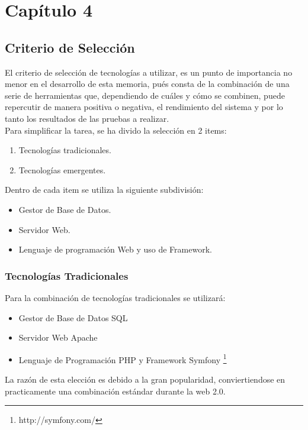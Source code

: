 \chapter{Capítulo 4}

\section{Criterio de Selección}

El criterio de selección de tecnologías a utilizar, es un punto de importancia no menor en 
el desarrollo de esta memoria, pués consta de la combinación de una serie de herramientas que, 
dependiendo de cuáles y cómo se combinen, puede repercutir de manera positiva o negativa, el 
rendimiento del sistema y por lo tanto los resultados de las pruebas a realizar.\\

Para simplificar la tarea, se ha divido la selección en 2 items:
\begin{enumerate}
 \item Tecnologías tradicionales.
 \item Tecnologías emergentes.
\end{enumerate}

Dentro de cada item se utiliza la siguiente subdivisión:
\begin{itemize}
 \item Gestor de Base de Datos.
 \item Servidor Web.
 \item Lenguaje de programación Web y uso de Framework.
\end{itemize}



\subsection{Tecnologías Tradicionales}

Para la combinación de tecnologías tradicionales se utilizará:
\begin{itemize}
 \item Gestor de Base de Datos SQL
 \item Servidor Web Apache
 \item Lenguaje de Programación PHP y Framework Symfony \footnote{http://symfony.com/}
\end{itemize}

La razón de esta elección es debido a la gran popularidad, conviertiendose en practicamente una
combinación estándar durante la web 2.0. \\

